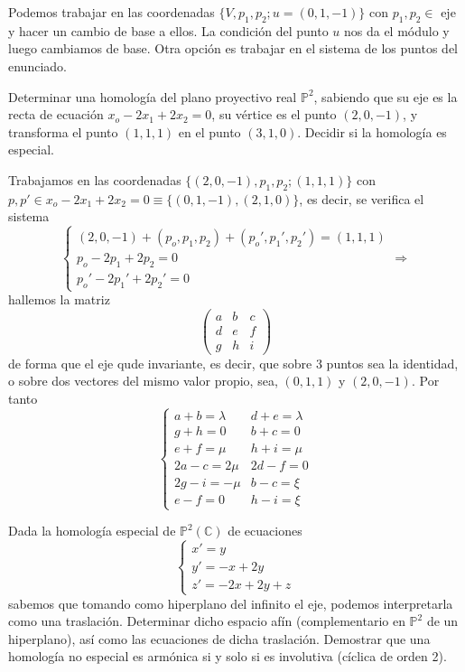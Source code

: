 \begin{sol}
    Podemos trabajar en las coordenadas $\{V,p_1,p_2;u=(0,1,-1)\}$ con $p_1, p_2 \in $ eje y hacer un cambio de base a ellos. La condici\'on del punto $u$ nos da el m\'odulo y luego cambiamos de base. Otra opci\'on es trabajar en el sistema de los puntos del enunciado. 
\end{sol}
\begin{ejer}
    [3] Determinar una homolog\'ia del plano proyectivo real $\mathbb P^2$, sabiendo que su eje es la recta de ecuaci\'on $x_o - 2x_1 + 2x_2 = 0$, su v\'ertice es el punto $(2, 0, -1)$, y transforma el punto $(1, 1, 1)$ en el punto $(3, 1, 0)$. Decidir si la homolog\'ia es especial.
\end{ejer}
\begin{sol}
    Trabajamos en las coordenadas $\{(2, 0, -1), p_1,p_2 ; (1, 1, 1)\}$ con $p, p' \in x_o - 2x_1 + 2x_2 = 0 \equiv \{(0,1,-1), (2,1,0)\}$, es decir, se verifica el sistema
    $$\begin{cases}
        (2, 0, -1) + (p_o,p_1,p_2)+(p_o',p_1',p_2') = (1,1,1) \\  p_o - 2p_1 + 2p_2 = 0 \\ p_o' - 2p_1' + 2p_2' = 0
    \end{cases} \Rightarrow$$
    hallemos la matriz
    $$\begin{pmatrix}
        a & b & c \\ d & e & f \\ g & h & i  
    \end{pmatrix}$$
    de forma que el eje qude invariante, es decir, que sobre 3 puntos sea la identidad, o sobre dos vectores del mismo valor propio, sea, $(0,1,1)$ y $(2,0,-1)$. Por tanto
    $$\begin{cases}
        a+b=\lambda & d+e=\lambda \\ g+h=0 & b+c=0 \\ e+f=\mu & h+i=\mu \\ 2a-c=2\mu & 2d-f=0 \\ 2g-i=-\mu & b-c=\xi \\ e-f=0 & h-i=\xi
    \end{cases}$$
\end{sol}
\begin{ejer}
    [7] Dada la homolog\'ia especial de $\mathbb P^2 (\mathbb C)$ de ecuaciones $$\begin{cases}
        x'=y \\ y'=-x+2y \\ z' = -2x+2y+z
    \end{cases}$$
    sabemos que tomando como hiperplano del infinito el eje, podemos interpretarla como una
    traslaci\'on. Determinar dicho espacio af\'in (complementario en $\mathbb P^2$ de un hiperplano), as\'i como las ecuaciones de dicha traslaci\'on. Demostrar que una homología no especial es armónica si y solo si es involutiva (c\'iclica de orden 2).
\end{ejer}
